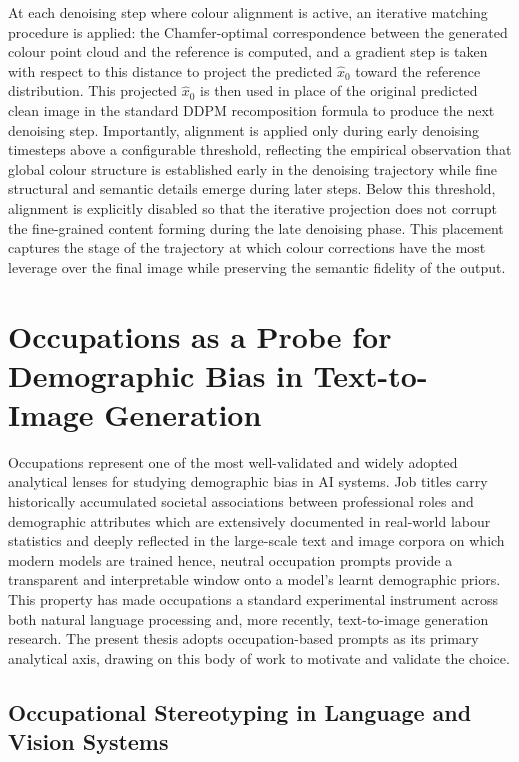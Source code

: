 At each denoising step where colour alignment is active, an 
iterative matching procedure is applied: the Chamfer-optimal 
correspondence between the generated colour point cloud and the 
reference is computed, and a gradient step is taken with respect 
to this distance to project the predicted $\hat{x}_0$ toward the 
reference distribution. This projected $\hat{x}_0$ is then used 
in place of the original predicted clean image in the standard DDPM 
recomposition formula to produce the next denoising step. 
Importantly, alignment is applied only during early denoising 
timesteps above a configurable threshold, reflecting the empirical 
observation that global colour structure is established early in 
the denoising trajectory while fine structural and semantic details 
emerge during later steps. Below this threshold, alignment is 
explicitly disabled so that the iterative projection does not 
corrupt the fine-grained content forming during the late denoising 
phase. This placement captures the stage of the trajectory at which 
colour corrections have the most leverage over the final image 
while preserving the semantic fidelity of the output.


\section{Occupations as a Probe for Demographic Bias in Text-to-Image Generation}
\label{subsec:occupations}

Occupations represent one of the most well-validated and widely adopted analytical lenses for
studying demographic bias in AI systems. Job titles carry historically accumulated
societal associations between professional roles and demographic attributes which are extensively documented in real-world labour statistics and deeply reflected in the
large-scale text and image corpora on which modern models are trained hence, neutral occupation
prompts provide a transparent and interpretable window onto a model's learnt demographic
priors.  This property has made occupations a standard experimental instrument across both
natural language processing and, more recently, text-to-image generation research.  The
present thesis adopts occupation-based prompts as its primary analytical axis, drawing on this
body of work to motivate and validate the choice.

\subsection{Occupational Stereotyping in Language and Vision Systems}
\label{subsubsec:occupational_stereo}

